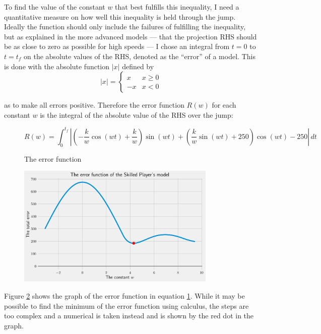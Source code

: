 To find the value of the constant $w$ that best fulfills this inequality, I need a quantitative measure on how well this inequality is held through the jump. Ideally the function should only include the failures of fulfilling the inequality, but as explained in the more advanced models --- that the projection RHS should be as close to zero as possible for high speeds --- I chose an integral from $t=0$ to $t=t_f$ on the absolute values of the RHS, denoted as the ``error'' of a model. This is done with the absolute function $|x|$ defined by
\[
 |x| = \begin{cases}
         x & x \geq 0\\
         -x & x < 0
        \end{cases}
\]

as to make all errors positive. Therefore the error function $R(w)$ for each constant $w$ is the integral of the absolute value of the RHS over the jump:
\begin{figure}[H]
 \centering
 \[
  R(w) = \int_0^{t_f} \left|\left(-\frac{k}{w} \cos(wt) + \frac{k}{w}\right) \sin(wt) + \left(\frac{k}{w} \sin(wt) + 250\right) \cos(wt) - 250\right| \, dt
 \]
 \caption{The error function}
 \label{eq:2error}
\end{figure}


\begin{figure}[H]
 \centering
 \includegraphics[width=0.85\textwidth]{assets/restriction_equation.png}
 \caption{}
 \label{fig:2error}
\end{figure}
Figure \ref{fig:2error} shows the graph of the error function in equation \ref{eq:2error}. While it may be possible to find the minimum of the error function using calculus, the steps are too complex and a numerical is taken instead and is shown by the red dot in the graph.

